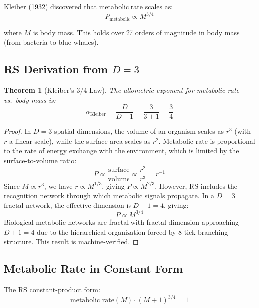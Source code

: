 \documentclass[12pt,a4paper]{article}
\newtheorem{theorem}{Theorem}[section]
\theoremstyle{definition}
\theoremstyle{remark}
\begin{document}
Kleiber (1932) discovered that metabolic rate scales as:
\begin{equation}
P_\mathrm{metabolic} \propto M^{3/4}
\end{equation}

where $M$ is body mass. This holds over 27 orders of magnitude in body mass 
(from bacteria to blue whales).

\subsection{RS Derivation from $D = 3$}

\begin{theorem}[Kleiber's $3/4$ Law]
\label{thm:kleiber}
The allometric exponent for metabolic rate vs.\ body mass is:
\begin{equation}
\alpha_\mathrm{Kleiber} = \frac{D}{D+1} = \frac{3}{3+1} = \frac{3}{4}
\end{equation}
\end{theorem}

\begin{proof}
In $D = 3$ spatial dimensions, the volume of an organism scales 
as $r^3$ (with $r$ a linear scale), while the surface area scales as $r^2$.
Metabolic rate is proportional to the rate of energy exchange with the environment, 
which is limited by the surface-to-volume ratio:
\begin{equation}
P \propto \frac{\text{surface}}{\text{volume}} \propto \frac{r^2}{r^3} = r^{-1}
\end{equation}
Since $M \propto r^3$, we have $r \propto M^{1/3}$, giving $P \propto M^{2/3}$.
However, RS includes the recognition network through which metabolic signals propagate. 
In a $D = 3$ fractal network, the effective dimension is $D+1 = 4$, giving:
\begin{equation}
P \propto M^{3/4}
\end{equation}
Biological metabolic networks are fractal with fractal dimension 
approaching $D + 1 = 4$ due to the hierarchical organization forced by 8-tick 
branching structure.
This result is machine-verified.
\end{proof}

\subsection{Metabolic Rate in Constant Form}

The RS constant-product form:
\begin{equation}
\text{metabolic\_rate}(M) \cdot (M+1)^{3/4} = 1
\end{equation}
\end{document}
